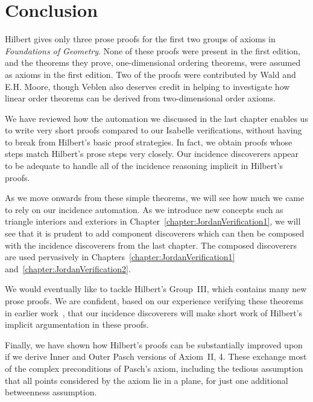 \section{Conclusion}
Hilbert gives only three prose proofs for the first two groups of axioms in \emph{Foundations of Geometry}. None of these proofs were present in the first edition, and the theorems they prove, one-dimensional ordering theorems, were assumed as axioms in the first edition. Two of the proofs were contributed by Wald and E.H. Moore, though Veblen also deserves credit in helping to investigate how linear order theorems can be derived from  two-dimensional order axioms.

We have reviewed how the automation we discussed in the last chapter enables us to write very short proofs compared to our Isabelle verifications, without having to break from Hilbert's basic proof strategies. In fact, we obtain proofs whose steps match Hilbert's prose steps very closely. Our incidence discoverers appear to be adequate to handle all of the incidence reasoning implicit in Hilbert's proofs.

As we move onwards from these simple theorems, we will see how much we came to rely on our incidence automation. As we introduce new concepts such as triangle interiors and exteriors in Chapter~\ref{chapter:JordanVerification1}, we will see that it is prudent to add component discoverers which can then be composed with the incidence discoverers from the last chapter. The composed discoverers are used pervasively in Chapters~\ref{chapter:JordanVerification1} and~\ref{chapter:JordanVerification2}. 

We would eventually like to tackle Hilbert's Group~III, which contains many new prose proofs. We are confident, based on our experience verifying these theorems in earlier work~\cite{ScottMScThesis}, that our incidence discoverers will make short work of Hilbert's implicit argumentation in these proofs.

Finally, we have shown how Hilbert's proofs can be substantially improved upon if we derive Inner and Outer Pasch versions of Axiom~II, 4. These exchange most of the complex preconditions of Pasch's axiom, including the tedious assumption that all points considered by the axiom lie in a plane, for just one additional betweenness assumption.

